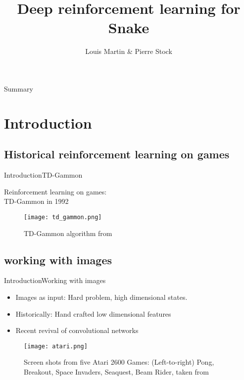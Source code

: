 \documentclass{beamer}
\title[Deep Snake]{Deep reinforcement learning for Snake}
\author{Louis Martin \& Pierre Stock}
\institute{Ecole Normale Supérieure de Cachan, MVA}
\begin{document}
\begin{frame}
  \titlepage
\end{frame}


\begin{frame}{Summary}
  \tableofcontents
\end{frame}

\section{Introduction}

\subsection{Historical reinforcement learning on games}
\begin{frame}{Introduction}{TD-Gammon}
  \begin{center}
    \Large Reinforcement learning on games:\\ TD-Gammon in 1992
  \end{center}
    \begin{figure}[!htbp]
    \centering
      \texttt{[image: td\_gammon.png]}
      \caption{TD-Gammon algorithm from \cite{tesauro1995temporal}}
    \end{figure}
\end{frame}

\subsection{working with images}
\begin{frame}{Introduction}{Working with images}
  \begin{itemize}
    \item Images as input: Hard problem, high dimensional states.
    \item Historically: Hand crafted low dimensional features
    \item Recent revival of convolutional networks
  \end{itemize}

  \begin{figure}[h]
  \centering
    \texttt{[image: atari.png]}
    \caption{Screen shots from five Atari 2600 Games: (Left-to-right) Pong, Breakout, Space Invaders,
  Seaquest, Beam Rider, taken from \cite{mnih2013playing}}
  \end{figure}
\end{frame}
\end{document}
